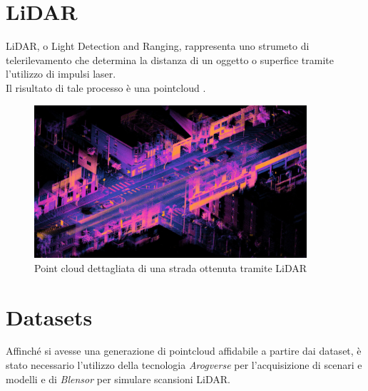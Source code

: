 \documentclass[italian]{report}
\begin{document}
\section{LiDAR}
LiDAR, o Light Detection and Ranging, rappresenta uno strumeto di telerilevamento che determina la distanza di un oggetto o superfice tramite l'utilizzo di impulsi laser.\\
Il risultato di tale processo è una pointcloud \cite{LiDAR}.\\
\begin{figure}[H]
	\centering
	\includegraphics[width=0.9\textwidth]{LiDAR}
	\footnotesize
	\caption{Point cloud dettagliata di una strada ottenuta tramite LiDAR}
\end{figure}
\section{Datasets}
Affinché si avesse una generazione di pointcloud affidabile a partire dai dataset, è stato necessario l'utilizzo della tecnologia \textit{Arogverse} per l'acquisizione di scenari e modelli e di \textit{Blensor} per simulare scansioni LiDAR.
\end{document}
